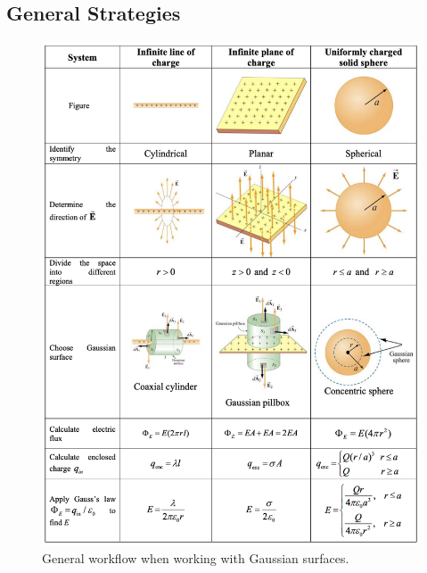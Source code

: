 \documentclass[11pt, letterpaper]{article}
\begin{document}
	\subsection{General Strategies}
	\begin{figure}[h!]
		\centering
		\includegraphics[scale=0.8]{gaussian_guide}
		\caption{General workflow when working with Gaussian surfaces.}
	
	\end{figure}
	
\end{document}
